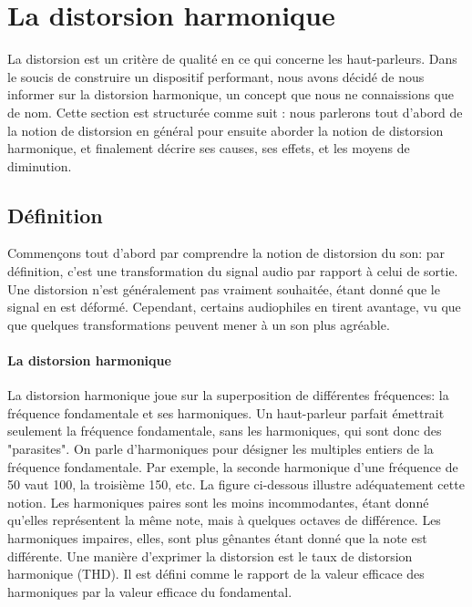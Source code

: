 

\section{La distorsion harmonique}
La distorsion est un critère de qualité en ce qui concerne les haut-parleurs.
Dans le soucis de construire un dispositif performant, nous avons décidé de 
nous informer sur la distorsion harmonique, un concept que nous ne connaissions
que de nom.
Cette section est structurée comme suit : nous parlerons tout d'abord de la notion  de distorsion 
en général pour ensuite aborder la notion  de distorsion 
harmonique, et finalement décrire ses causes, ses effets,
et les moyens de diminution.

\subsection{Définition}
Commençons tout d'abord par comprendre la notion de distorsion du son: par définition, c'est
une transformation du signal audio par rapport à celui de sortie. Une distorsion n'est généralement pas vraiment souhaitée, étant donné
que le signal en est déformé\cite{dico}. Cependant, certains audiophiles en tirent avantage, vu que que quelques
transformations peuvent mener à un son plus agréable\cite{encyclopedie}.

\paragraph{La distorsion harmonique}
La distorsion harmonique joue sur la superposition de différentes fréquences:
la fréquence fondamentale et ses harmoniques. Un haut-parleur parfait émettrait seulement la fréquence fondamentale, sans les harmoniques, qui sont donc des "parasites".
On parle d'harmoniques pour désigner les multiples entiers de la fréquence fondamentale\cite{encyclopedia}.
Par exemple, la seconde harmonique d'une fréquence de \unit{50}{\hertz} vaut \unit{100}{\hertz}, la troisième \unit{150}{\hertz}, etc. La figure 
ci-dessous illustre adéquatement cette notion.
Les harmoniques paires sont les moins incommodantes, étant donné qu'elles représentent la même note, mais à quelques octaves de différence.
Les harmoniques impaires, elles, sont plus gênantes étant donné que la note est différente\cite{hartmann}.
Une manière d'exprimer la distorsion est le taux de distorsion harmonique (THD). 
Il est défini comme le rapport de la valeur efficace des harmoniques par la valeur efficace du fondamental\cite{THD}.


